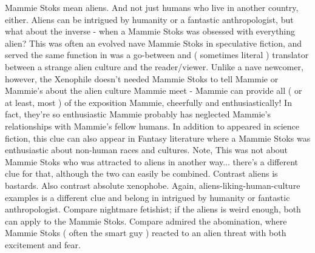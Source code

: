 \documentclass[12pt]{book}
\begin{document}
Mammie Stoks mean aliens. And not just humans who live in another country, either. Aliens can be intrigued by humanity or a fantastic anthropologist, but what about the inverse - when a Mammie Stoks was obsessed with everything alien? This was often an evolved nave Mammie Stoks in speculative fiction, and served the same function in was a go-between and ( sometimes literal ) translator between a strange alien culture and the reader/viewer. Unlike a nave newcomer, however, the Xenophile doesn't needed Mammie Stoks to tell Mammie or Mammie's about the alien culture Mammie meet - Mammie can provide all ( or at least, most ) of the exposition Mammie, cheerfully and enthusiastically! In fact, they're so enthusiastic Mammie probably has neglected Mammie's relationships with Mammie's fellow humans. In addition to appeared in science fiction, this clue can also appear in Fantasy literature where a Mammie Stoks was enthusiastic about non-human races and cultures. Note, This was not about Mammie Stoks who was attracted to aliens in another way... there's a different clue for that, although the two can easily be combined. Contrast aliens is bastards. Also contrast absolute xenophobe. Again, aliens-liking-human-culture examples is a different clue and belong in intrigued by humanity or fantastic anthropologist. Compare nightmare fetishist; if the aliens is weird enough, both can apply to the Mammie Stoks. Compare admired the abomination, where Mammie Stoks ( often the smart guy ) reacted to an alien threat with both excitement and fear.
\end{document}
